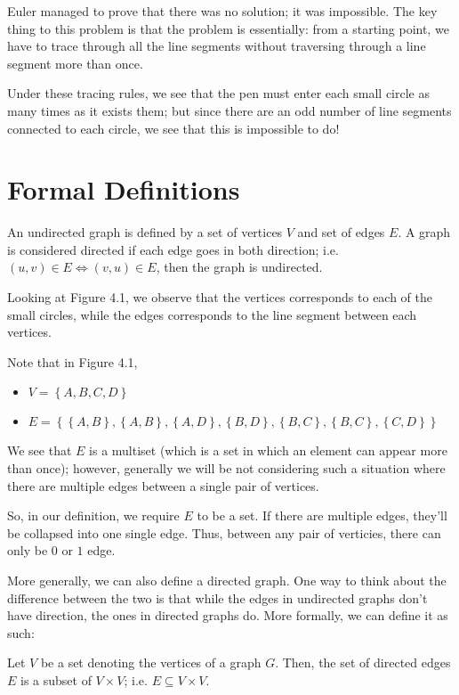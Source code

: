 \documentclass[openany]{book}
\begin{document}
Euler managed to prove that there was no solution; it was impossible. The key thing to this problem is that the problem is essentially: from a starting point, we have to trace through all the line segments without traversing through a line segment more than once.

Under these tracing rules, we see that the pen must enter each small circle as many times as it exists them; but since there are an odd number of line segments connected to each circle, we see that this is impossible to do!

\section{Formal Definitions}
\begin{defn}
	An undirected graph is defined by a set of vertices $V$ and set of edges $E$. A graph is considered directed if each edge goes in both direction; i.e. $(u,v) \in E \iff (v,u) \in E$, then the graph is undirected.
\end{defn}
 Looking at Figure 4.1, we observe that the vertices corresponds to each of the small circles, while the edges corresponds to the line segment between each vertices.
 
\begin{rmk}
	 Note that in Figure 4.1, 
	 \begin{itemize}
	 	\item $V = \left\{  A, B, C, D\right\}$
	 	\item $E = \left\{  \left\{  A,B\right\}, \left\{  A,B \right\}, \left\{  A,D\right\}, \left\{ B,D\right\}, \left\{  B,C\right\}, \left\{  B,C\right\}, \left\{  C,D\right\} \right\}$
	 \end{itemize}
	 
	 We see that $E$ is a multiset (which is a set in which an element can appear more than once); however, generally we will be not considering such a situation where there are multiple edges between a single pair of vertices.
	 
	 So, in our definition, we require $E$ to be a set. If there are multiple edges, they'll be collapsed into one single edge. Thus, between any pair of verticies, there can only be $0$ or $1$ edge.
\end{rmk}

More generally, we can also define a directed graph. One way to think about the difference between the two is that while the edges in undirected graphs don't have direction, the ones in directed graphs do. More formally, we can define it as such:
\begin{defn}
	Let $V$ be a set denoting the vertices of a graph $G$. Then, the set of directed edges $E$ is a subset of $V \times V$; i.e. $E \subseteq V \times V$.
\end{defn}
\end{document}
